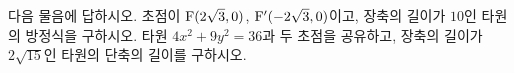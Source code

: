 다음 물음에 답하시오.
 초점이 $\mathrm{F}(2\sqrt{3}{,}\mkern3mu\mathopen{}0)$, $\mathrm{F}'(-2\sqrt{3}{,}\mkern3mu\mathopen{}0)$이고, 장축의 길이가 $10$인 타원의 방정식을 구하시오.
 타원 $4x^2+9y^2=36$과 두 초점을 공유하고, 장축의 길이가 $2\sqrt{15}$인 타원의 단축의 길이를 구하시오.
